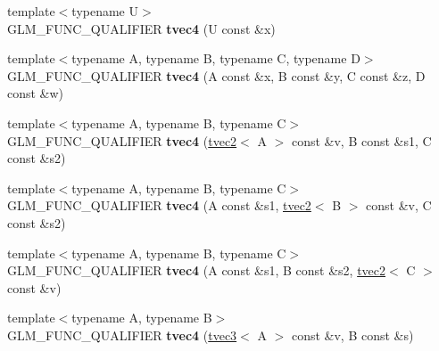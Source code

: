 \begin{DoxyCompactItemize}
\item 
\hypertarget{structglm_1_1detail_1_1tvec4_aaf3a0ae60f53a7abbf398639d0cd9229}{{\footnotesize template$<$typename U$>$ }\\G\-L\-M\-\_\-\-F\-U\-N\-C\-\_\-\-Q\-U\-A\-L\-I\-F\-I\-E\-R {\bfseries tvec4} (U const \&x)}\label{structglm_1_1detail_1_1tvec4_aaf3a0ae60f53a7abbf398639d0cd9229}

\item 
\hypertarget{structglm_1_1detail_1_1tvec4_a0ef0de76de875005e8c18f1c8202ce13}{{\footnotesize template$<$typename A, typename B, typename C, typename D$>$ }\\G\-L\-M\-\_\-\-F\-U\-N\-C\-\_\-\-Q\-U\-A\-L\-I\-F\-I\-E\-R {\bfseries tvec4} (A const \&x, B const \&y, C const \&z, D const \&w)}\label{structglm_1_1detail_1_1tvec4_a0ef0de76de875005e8c18f1c8202ce13}

\item 
\hypertarget{structglm_1_1detail_1_1tvec4_a8672008b9295d2b6ecb4da23dec10afd}{{\footnotesize template$<$typename A, typename B, typename C$>$ }\\G\-L\-M\-\_\-\-F\-U\-N\-C\-\_\-\-Q\-U\-A\-L\-I\-F\-I\-E\-R {\bfseries tvec4} (\hyperlink{structglm_1_1detail_1_1tvec2}{tvec2}$<$ A $>$ const \&v, B const \&s1, C const \&s2)}\label{structglm_1_1detail_1_1tvec4_a8672008b9295d2b6ecb4da23dec10afd}

\item 
\hypertarget{structglm_1_1detail_1_1tvec4_a44561621356875a7dc541c2fee63aed4}{{\footnotesize template$<$typename A, typename B, typename C$>$ }\\G\-L\-M\-\_\-\-F\-U\-N\-C\-\_\-\-Q\-U\-A\-L\-I\-F\-I\-E\-R {\bfseries tvec4} (A const \&s1, \hyperlink{structglm_1_1detail_1_1tvec2}{tvec2}$<$ B $>$ const \&v, C const \&s2)}\label{structglm_1_1detail_1_1tvec4_a44561621356875a7dc541c2fee63aed4}

\item 
\hypertarget{structglm_1_1detail_1_1tvec4_ad3e23fa699ae4e8128aeb55ada3f7c63}{{\footnotesize template$<$typename A, typename B, typename C$>$ }\\G\-L\-M\-\_\-\-F\-U\-N\-C\-\_\-\-Q\-U\-A\-L\-I\-F\-I\-E\-R {\bfseries tvec4} (A const \&s1, B const \&s2, \hyperlink{structglm_1_1detail_1_1tvec2}{tvec2}$<$ C $>$ const \&v)}\label{structglm_1_1detail_1_1tvec4_ad3e23fa699ae4e8128aeb55ada3f7c63}

\item 
\hypertarget{structglm_1_1detail_1_1tvec4_a7e72b31ab75609668d91bc9c5b7cf28d}{{\footnotesize template$<$typename A, typename B$>$ }\\G\-L\-M\-\_\-\-F\-U\-N\-C\-\_\-\-Q\-U\-A\-L\-I\-F\-I\-E\-R {\bfseries tvec4} (\hyperlink{structglm_1_1detail_1_1tvec3}{tvec3}$<$ A $>$ const \&v, B const \&s)}\label{structglm_1_1detail_1_1tvec4_a7e72b31ab75609668d91bc9c5b7cf28d}


\end{DoxyCompactItemize}
